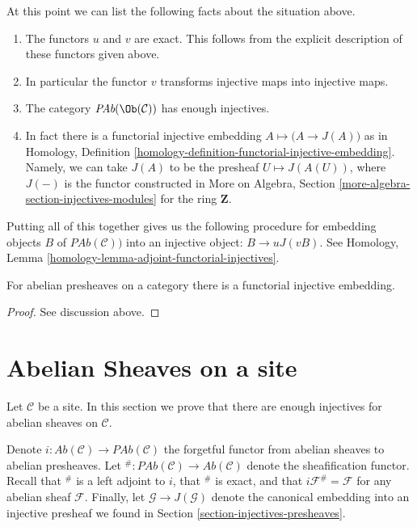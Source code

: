 \medskip\noindent
At this point we can list the following facts
about the situation above.
\begin{enumerate}
\item The functors $u$ and $v$ are exact. This follows from
the explicit description of these functors given above.
\item In particular the functor $v$ transforms injective maps
into injective maps.
\item The category $\textit{PAb}(\Ob(\mathcal{C}))$
has enough injectives.
\item In fact there is a functorial injective embedding
$A \mapsto \big(A \to J(A)\big)$ as in
Homology, Definition \ref{homology-definition-functorial-injective-embedding}.
Namely, we can take $J(A)$ to be the
presheaf $U\mapsto J(A(U))$, where
$J(-)$ is the functor constructed in
More on Algebra, Section \ref{more-algebra-section-injectives-modules}
for the ring $\mathbf{Z}$.
\end{enumerate}
Putting all of this together gives us the following procedure
for embedding objects $B$ of $\textit{PAb}(\mathcal{C}))$ into
an injective object: $B \to uJ(vB)$. See
Homology, Lemma \ref{homology-lemma-adjoint-functorial-injectives}.

\begin{proposition}
\label{proposition-presheaves-injectives}
For abelian presheaves on a category there is a functorial injective
embedding.
\end{proposition}

\begin{proof}
See discussion above.
\end{proof}












\section{Abelian Sheaves on a site}
\label{section-injectives-sheaves}

\noindent
Let $\mathcal{C}$ be a site. In this section we prove that there are
enough injectives for abelian sheaves on $\mathcal{C}$.

\medskip\noindent
Denote
$i : \textit{Ab}(\mathcal{C}) \longrightarrow \textit{PAb}(\mathcal{C})$
the forgetful functor from abelian sheaves to abelian presheaves.
Let
${}^\# : \textit{PAb}(\mathcal{C}) \longrightarrow \textit{Ab}(\mathcal{C})$
denote the sheafification functor. Recall that ${}^\#$ is a left adjoint
to $i$, that ${}^\#$ is exact, and that $i\mathcal{F}^\# = \mathcal{F}$
for any abelian sheaf $\mathcal{F}$. Finally, let
$\mathcal{G} \to J(\mathcal{G})$ denote the canonical
embedding into an injective presheaf we found in
Section \ref{section-injectives-presheaves}.

